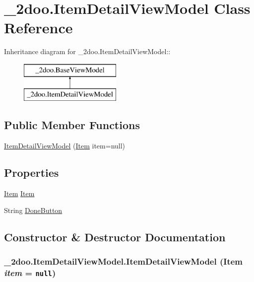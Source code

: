 \hypertarget{class__2doo_1_1_item_detail_view_model}{
\section{\_\-2doo.ItemDetailViewModel Class Reference}
\label{class__2doo_1_1_item_detail_view_model}
}
Inheritance diagram for \_\-2doo.ItemDetailViewModel::\begin{figure}[H]
\begin{center}
\leavevmode
\includegraphics[height=2cm]{class__2doo_1_1_item_detail_view_model}
\end{center}
\end{figure}
\subsection*{Public Member Functions}
\begin{CompactItemize}
\item 
\hyperlink{class__2doo_1_1_item_detail_view_model_a2b63d225210eab343ea37172a586c80}{ItemDetailViewModel} (\hyperlink{class__2doo_1_1_item}{Item} item=null)
\end{CompactItemize}
\subsection*{Properties}
\begin{CompactItemize}
\item 
\hyperlink{class__2doo_1_1_item}{Item} \hyperlink{class__2doo_1_1_item_detail_view_model_0594aef89a2ce815fbf010db5b3207a7}{Item}
\item 
String \hyperlink{class__2doo_1_1_item_detail_view_model_79e02bd4fc6305e2dc0442f7cdd12f27}{DoneButton}
\end{CompactItemize}


\subsection{Constructor \& Destructor Documentation}
\hypertarget{class__2doo_1_1_item_detail_view_model_a2b63d225210eab343ea37172a586c80}{
\subsubsection[{ItemDetailViewModel}]{\setlength{\rightskip}{0pt plus 5cm}\_\-2doo.ItemDetailViewModel.ItemDetailViewModel ({\bf Item} {\em item} = {\tt null})}}
\label{class__2doo_1_1_item_detail_view_model_a2b63d225210eab343ea37172a586c80}




